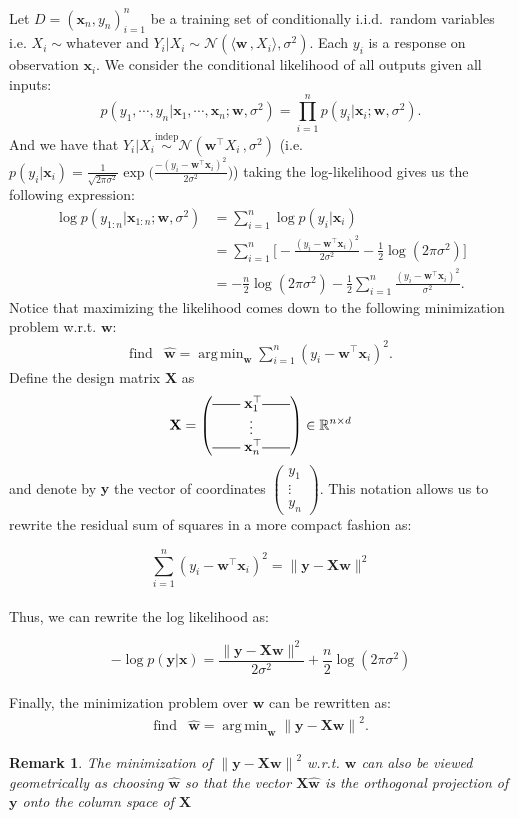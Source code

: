 \documentclass[12pt]{report}
\def\R{\mathbb{R}}
\newcommand{\defobj}[1]{\color{red}#1\color{black}{}}
\renewcommand{\emph}[1]{\color{violet}#1\color{black}{}}
\newcommand{\vectorline}{\rule[2px]{2em}{0.5px}}
\DeclareMathOperator*{\argmin}{arg\,min}
\def\XX{\mathbf{X}}
\def\wb{\mathbf{w}}
\def\xb{\mathbf{x}}
\def\yb{\mathbf{y}}
\def\ts{\top}
\newcommand{\normal}{\mathcal{N}}
\newtheorem{remark}{Remark}[section]
\begin{document}
 Let $D=(\xb_n,y_n)_{i=1}^n$ be a training set of conditionally i.i.d.\ random variables i.e. $X_i \sim \text{whatever}$ and $Y_i | X_i \sim \normal(\langle \wb \,, X_i \rangle, \sigma^2)$. Each $y_i$ is a \defobj{response} on
 observation $\xb_i$. We consider the \emph{conditional} likelihood of all outputs given all inputs:
 $$
 p(y_1, \cdots , y_n | \xb_1, \cdots, \xb_n ; {\wb},\sigma^2) = \prod_{i=1}^n p(y_i | \xb_i ; {\wb},\sigma^2).
 $$
 And we have that $Y_i|X_i \overset{\text{indep}}{\sim} \normal(\wb^{\ts}X_i \, , \sigma^2)$
 (i.e. $p(y_i|\xb_i) = \frac{1}{\sqrt{2\pi\sigma^2}}\exp\big( \frac{-(y_i - \wb^{\ts}\xb_i)^2}{2\sigma^2} \big)$) taking the log-likelihood gives us the following expression:
\begin{align*}
    \log p(y_{1:n}|\xb_{1:n} ; {\wb},\sigma^2) &= \sum_{i=1}^n{\log p(y_i|\xb_i)}
    \\
    &= \sum_{i=1}^n \bigg[ -\frac{(y_i - \wb^{\ts}\xb_i)^2}{2\sigma^2} - \frac{1}{2}\log(2\pi\sigma^2) \bigg]
    \\
    &= - \frac{n}{2}\log(2\pi\sigma^2) - \frac{1}{2}\sum_{i=1}^n{\frac{(y_i-{\wb}^{\ts}\xb_i)^2}{\sigma^2}}.
 \end{align*}
Notice that maximizing the likelihood comes down to the following minimization problem w.r.t. $\wb$:
$$
\begin{array}{ll}
\mathrm{find} & \hat{\wb} = \argmin_{\wb} \sum_{i=1}^n{(y_i-{\wb}^{\ts}\xb_i)^2}.
\end{array}
$$
 Define the \defobj{design matrix} $\XX$ as
 $$
 \XX = \begin{pmatrix}
 \vectorline \; \xb_1^{\ts} \vectorline
  \\ \vdots
  \\ \vectorline \; \xb_n^{\ts} \vectorline
 \end{pmatrix} \in \R^{n\times d}
 $$
 and denote by $\yb$ the vector of coordinates $\begin{pmatrix} y_1 \\ \vdots \\ y_n \end{pmatrix}$. This notation
 allows us to rewrite the residual sum of squares in a more compact fashion as:

 $$
 \sum_{i=1}^n (y_i-{\wb}^{\ts}\xb_i)^2 = \lVert \yb - \XX\wb \rVert^2
 $$
\\
 Thus, we can rewrite the log likelihood as:

 $$
 -\log p(\yb|\xb) = \frac{\lVert \yb - \XX\wb \rVert^2}{2\sigma^2} +
 \frac{n}{2}\log(2\pi\sigma^2)
 $$
\\
 Finally, the minimization problem over $\wb$ can be rewritten as:
 $$
 \begin{array}{ll}
 \mathrm{find} & \hat{\wb} = \argmin_{\wb} {\lVert \yb - \XX\wb \rVert}^2.
 \end{array}
 $$
\begin{remark}
    The minimization of ${\lVert \yb - \XX\wb \rVert}^2$ w.r.t. $\wb$ can also be
    viewed geometrically as choosing $\hat{\wb}$ so that the vector $\XX\hat{\wb}$ is the
    orthogonal projection of $\yb$ onto the column space of $\XX$
\end{remark}
\end{document}
